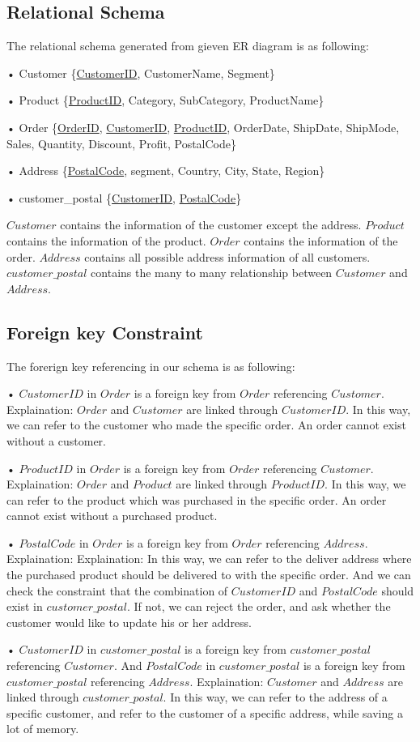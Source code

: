 \subsection{Relational Schema}
\label{sect:sub-title}
The relational schema generated from gieven ER diagram is as following: \par
• Customer \{\underline{CustomerID}, CustomerName, Segment\} \par
• Product \{\underline{ProductID}, Category, SubCategory, ProductName\}  \par
• Order \{\underline{OrderID}, \underline{CustomerID}, \underline{ProductID}, OrderDate, ShipDate, ShipMode, Sales, Quantity, Discount, Profit, PostalCode\} \par
• Address \{\underline{PostalCode}, segment, Country, City, State, Region\} \par
• customer\_postal \{\underline{CustomerID}, \underline{PostalCode}\}\par
$Customer$ contains the information of the customer except the address. $Product$ contains the information of the product. $Order$ contains the information of the order. $Address$ contains all possible address information of all customers. $customer\_postal$ contains the many to many relationship between $Customer$ and $Address$.

\subsection{Foreign key Constraint}
\label{sect:sub-title}
The forerign key referencing in our schema is as following:\par
• $CustomerID$ in $Order$ is a foreign key from $Order$ referencing $Customer$. 
Explaination: $Order$ and $Customer$ are linked through $CustomerID$. In this way, we can refer to the customer who made the specific order. An order 
cannot exist without a customer. \par
• $ProductID$ in $Order$ is a foreign key from $Order$ referencing $Customer$. 
Explaination: $Order$ and $Product$ are linked through $ProductID$. In this way, we can refer to the product which was purchased in the specific order. An order cannot exist without a purchased product. \par
• $PostalCode$ in $Order$ is a foreign key from $Order$ referencing $Address$. 
Explaination: Explaination: In this way, we can refer to the deliver address where the purchased product should be delivered to with the specific order. And we can check the constraint that the combination of $CustomerID$ and $PostalCode$ should exist in $customer\_postal$. If not, we can reject the order, and ask whether the customer would like to update his or her address. \par
• $CustomerID$ in $customer\_postal$ is a foreign key from $customer\_postal$ referencing $Customer$. And $PostalCode$ in $customer\_postal$ is a foreign key from $customer\_postal$ referencing $Address$. 
Explaination: $Customer$ and $Address$ are linked through  $customer\_postal$. In this way, we can refer to the 
address of a specific customer, and refer to the customer of a specific address, while saving a lot of memory. \par

